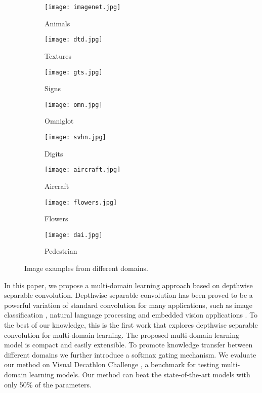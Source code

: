 \documentclass[letterpaper]{article} \usepackage{aaai19}  \usepackage{times}  \usepackage{helvet}  \usepackage{courier}  \usepackage{url}  \usepackage{graphicx}  \usepackage{amssymb}
\begin{document}
\begin{figure}
\centering
\begin{subfigure}{0.1\textwidth}
   \texttt{[image: imagenet.jpg]}
   \caption{Animals} \label{fig:x_a}
\end{subfigure}
\begin{subfigure}{0.1\textwidth}
   \texttt{[image: dtd.jpg]}
   \caption{Textures} \label{fig:x_a}
\end{subfigure}
\begin{subfigure}{0.1\textwidth}
   \texttt{[image: gts.jpg]}
   \caption{Signs} \label{fig:x_a}
\end{subfigure}
\begin{subfigure}{0.1\textwidth}
   \texttt{[image: omn.jpg]}
   \caption{Omniglot} \label{fig:x_a}
\end{subfigure}


\bigskip
\begin{subfigure}{0.1\textwidth}
   \texttt{[image: svhn.jpg]}
   \caption{Digits} \label{fig:x_a}
\end{subfigure}
\begin{subfigure}{0.1\textwidth}
   \texttt{[image: aircraft.jpg]}
   \caption{Aircraft} \label{fig:x_a}
\end{subfigure}
\begin{subfigure}{0.1\textwidth}
   \texttt{[image: flowers.jpg]}
   \caption{Flowers} \label{fig:x_a}
\end{subfigure}
\begin{subfigure}{0.1\textwidth}
   \texttt{[image: dai.jpg]}
   \caption{Pedestrian} \label{fig:x_a}
\end{subfigure}

\caption{Image examples from different domains. }
\label{figs: domains}
\end{figure}

In this paper, we propose a multi-domain learning approach based on depthwise separable convolution. Depthwise separable convolution has been proved to be a powerful variation of standard convolution for many applications, such as image classification \cite{chollet2017xception}, natural language processing \cite{kaiser2017depthwise} and embedded vision applications \cite{howard2017mobilenets}. To the best of our knowledge, this is the first work that explores depthwise separable convolution for multi-domain learning. The proposed multi-domain learning model is compact and easily extensible. To promote knowledge transfer between different domains we further introduce a softmax gating mechanism. We evaluate our method on Visual Decathlon Challenge \cite{rebuffi2017learning}, a benchmark for testing multi-domain learning models. Our method can beat the state-of-the-art models with only 50\% of the parameters.
\\
\end{document}
